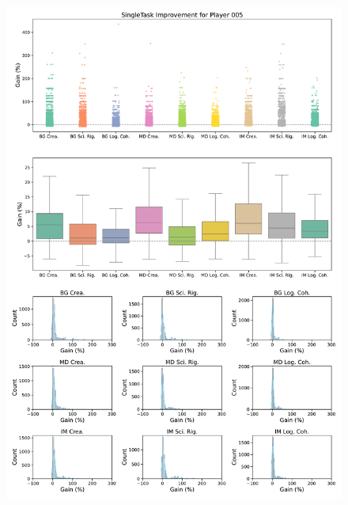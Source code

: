 \begin{figure}[ht]
  \centering
  \includegraphics[width=\textwidth]{figures/gain_validity/singletask/singletask_gain_player_00005.pdf}
\end{figure}
\clearpage

